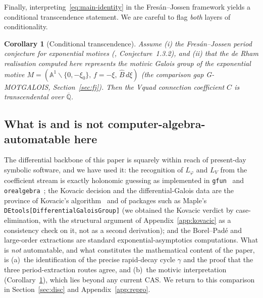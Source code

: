 \documentclass[11pt,reqno]{amsart}
\renewcommand{\_}{\vquadorigunderscore\allowbreak}
\theoremstyle{plain}
\newtheorem{corollary}[theorem]{Corollary}
\theoremstyle{definition}
\newcommand{\Bhat}{\widehat{B}}
\newcommand{\Lphi}{L_{\varphi}}
\newcommand{\LV}{L_{V}}
\newcommand{\Qbar}{\overline{\mathbb{Q}}}
\newcommand{\xizero}{\xi_0}
\providecommand{\C}{}\renewcommand{\C}{C}
\begin{document}
Finally, interpreting~\eqref{eq:main-identity} in the Fres\'an--Jossen framework yields a
conditional transcendence statement. We are careful to flag \emph{both} layers of
conditionality.

\begin{corollary}[Conditional transcendence]\label{cor:transc}
Assume \emph{(i)} the Fres\'an--Jossen period conjecture for exponential motives
\textup{(\cite{FJ}, Conjecture~1.3.2)}, and \emph{(ii)} that the de Rham realisation computed
here represents the motivic Galois group of the exponential motive
$M=(\mathbb{A}^1\smallsetminus\{0,-\xizero\},\,f=-\xi,\,\Bhat\,d\xi)$ \textup{(the comparison
gap G-MOTGALOIS, Section~\ref{sec:fj})}. Then the V\_quad connection coefficient $\C$ is
transcendental over $\Qbar$.
\end{corollary}

\subsection{What is and is not computer-algebra-automatable here}
The differential backbone of this paper is squarely within reach of present-day symbolic
software, and we have used it: the recognition of $\Lphi$ and $\LV$ from the coefficient stream
is exactly holonomic guessing as implemented in \texttt{gfun}~\cite{gfun} and
\texttt{ore\_algebra}~\cite{oreAlgebra}; the Kovacic decision and the differential-Galois data
are the province of Kovacic's algorithm~\cite{Kovacic} and of packages such as Maple's
\texttt{DEtools[DifferentialGaloisGroup]} (we obtained the Kovacic verdict by case-elimination,
with the structural argument of Appendix~\ref{app:kovacic} as a consistency check on it, not as
a second derivation); and the Borel--Pad\'e
and large-order extractions are standard exponential-asymptotics computations. What is
\emph{not} automatable, and what constitutes the mathematical content of the paper, is
(a)~the identification of the precise rapid-decay cycle $\gamma$ and the proof that the three
period-extraction routes agree, and (b)~the motivic interpretation
(Corollary~\ref{cor:transc}), which lies beyond any current CAS. We return to this comparison
in Section~\ref{sec:disc} and Appendix~\ref{app:repro}.
\end{document}
